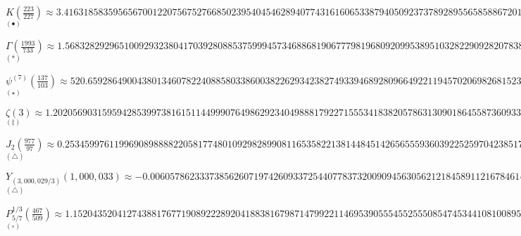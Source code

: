 \begin{flushleft}
\vspace{7.0pt} $K \left ( \frac{223}{227} \right ) \approx
3.41631858359565670012207567527668502395404546289407743161606533879405092373789289556585886720106710302495575197326342521631437646065992277...$ {\large{$^{\left ( \bullet \right )}$}}

\vspace{7.0pt} $\Gamma \left ( \frac{1993}{733} \right ) \approx
1.56832829296510092932380417039280885375999457346886819067779819680920995389510328229092820783838846775884559403142356232405237490702859216...$ {\large{$^{\left ( \ast \right )}$}}

\vspace{7.0pt} $\psi^{(7)} \left ( \frac{137}{103} \right ) \approx
520.6592864900438013460782240885803386003822629342382749339468928096649221194570206982681523534169510010458092056599132278529509015522757...$ {\large{$^{\left ( \star \right )}$}}

\vspace{7.0pt} $\zeta(3) \approx
1.20205690315959428539973816151144999076498629234049888179227155534183820578631309018645587360933525814619915779526071941849199599867328321378...$ {\large{$^{\left ( \ddag \right )}$}}

\vspace{7.0pt} $J_{2} \left ( \frac{977}{97} \right ) \approx
0.25345997611996908988882205817748010929828990811653582213814484514265655593603922525970423851794541649313648169738549772446871861265837837...$ {\large{$^{\left ( \triangle \right )}$}}

\vspace{7.0pt} $Y_{(3,000,029/3)} (1,000,033) \approx
-0.00605786233373856260719742609337254407783732009094563056212184589112167846144005691875952794032605904743545936222919457576...$ {\large{$^{\left ( \triangle \right )}$}}

\vspace{7.0pt} $P_{5/7}^{1/3} \left ( \frac{467}{509} \right ) \approx
1.152043520412743881767719089222892041883816798714799221146953905554552555085474534410810089575044220215409986872673618976971609478890845...$ {\large{$^{\left ( \circ \right )}$}}

\vspace{0.9pc}

\centering\hspace{0.0cm}\begin{minipage}{30.5cm}

\begin{flushleft}



\end{flushleft}

\end{minipage}

\end{flushleft}

